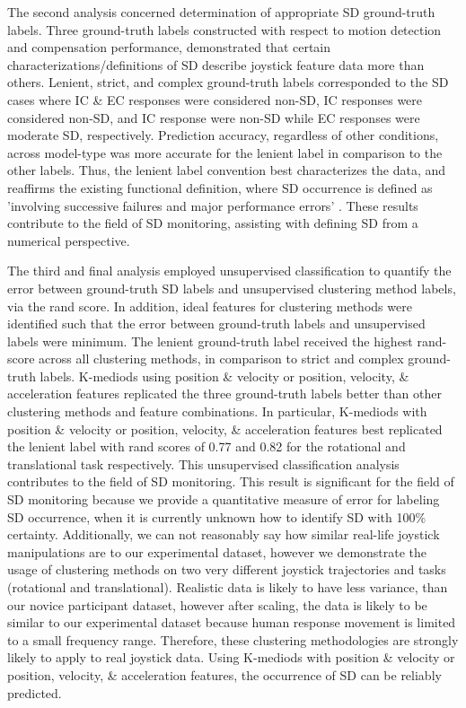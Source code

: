 \documentclass{ieeeaccess}
\begin{document}
The second analysis concerned determination of appropriate SD ground-truth labels. Three ground-truth labels constructed with respect to motion detection and compensation performance, demonstrated that certain characterizations/definitions of SD describe joystick feature data more than others. Lenient, strict, and complex ground-truth labels corresponded to the SD cases where IC \& EC responses were considered non-SD, IC responses were considered non-SD, and IC response were non-SD while EC responses were moderate SD, respectively. Prediction accuracy, regardless of other conditions, across model-type was more accurate for the lenient label in comparison to the other labels. Thus, the lenient label convention best characterizes the data, and reaffirms the existing functional definition, where SD occurrence is defined as 'involving successive failures and major performance errors' \cite{Newman_2007_SD}. These results contribute to the field of SD monitoring, assisting with defining SD from a numerical perspective. 

The third and final analysis employed unsupervised classification to quantify the error between ground-truth SD labels and unsupervised clustering method labels, via the rand score. In addition, ideal features for clustering methods were identified such that the error between ground-truth labels and unsupervised labels were minimum. The lenient ground-truth label received the highest rand-score across all clustering methods, in comparison to strict and complex ground-truth labels. K-mediods using position \& velocity or position, velocity, \& acceleration features replicated the three ground-truth labels better than other clustering methods and feature combinations. In particular, K-mediods with position \& velocity or position, velocity, \& acceleration features best replicated the lenient label with rand scores of 0.77 and 0.82 for the rotational and translational task respectively. This unsupervised classification analysis contributes to the field of SD monitoring. This result is significant for the field of SD monitoring because we provide a quantitative measure of error for labeling SD occurrence, when it is currently unknown how to identify SD with 100\% certainty. Additionally, we can not reasonably say how similar real-life joystick manipulations are to our experimental dataset, however we demonstrate the usage of clustering methods on two very different joystick trajectories and tasks (rotational and translational). Realistic data is likely to have less variance, than our novice participant dataset, however after scaling, the data is likely to be similar to our experimental dataset because human response movement is limited to a small frequency range. Therefore, these clustering methodologies are strongly likely to apply to real joystick data. Using K-mediods with position \& velocity or position, velocity, \& acceleration features, the occurrence of SD can be reliably predicted.
\end{document}
